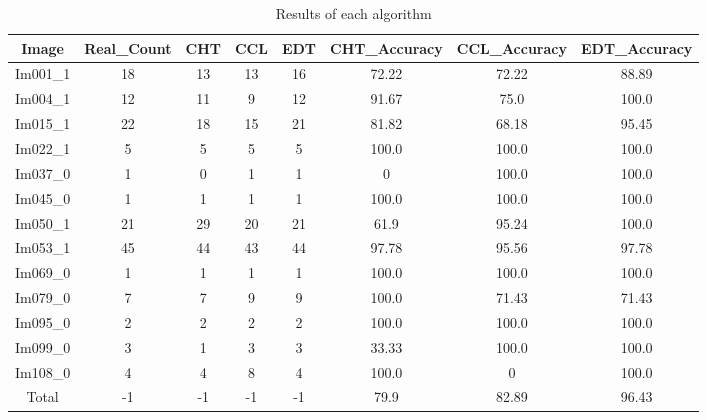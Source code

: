 \begin{table}[H]
    \centering
    \begin{tabular}{|c|c|c|c|c|c|c|c|}
    \hline
     \textbf{Image} & \textbf{Real\_Count} & \textbf{CHT} & \textbf{CCL} & \textbf{EDT} & \textbf{CHT\_Accuracy} & \textbf{CCL\_Accuracy} & \textbf{EDT\_Accuracy} \\ \hline
     Im001\_1 & 18 & 13 & 13 & 16 & 72.22 & 72.22 & 88.89 \\ 
     Im004\_1 & 12 & 11 & 9 & 12 & 91.67 & 75.0 & 100.0 \\ 
     Im015\_1 & 22 & 18 & 15 & 21 & 81.82 & 68.18 & 95.45 \\ 
     Im022\_1 & 5 & 5 & 5 & 5 & 100.0 & 100.0 & 100.0 \\ 
     Im037\_0 & 1 & 0 & 1 & 1 & 0 & 100.0 & 100.0 \\ 
     Im045\_0 & 1 & 1 & 1 & 1 & 100.0 & 100.0 & 100.0 \\ 
     Im050\_1 & 21 & 29 & 20 & 21 & 61.9 & 95.24 & 100.0 \\ 
     Im053\_1 & 45 & 44 & 43 & 44 & 97.78 & 95.56 & 97.78 \\ 
     Im069\_0 & 1 & 1 & 1 & 1 & 100.0 & 100.0 & 100.0 \\ 
     Im079\_0 & 7 & 7 & 9 & 9 & 100.0 & 71.43 & 71.43 \\ 
     Im095\_0 & 2 & 2 & 2 & 2 & 100.0 & 100.0 & 100.0 \\ 
     Im099\_0 & 3 & 1 & 3 & 3 & 33.33 & 100.0 & 100.0 \\ 
     Im108\_0 & 4 & 4 & 8 & 4 & 100.0 & 0 & 100.0 \\ \hline
     Total & -1 & -1 & -1 & -1 & 79.9 & 82.89 & 96.43 \\ 
    
    \hline
    \end{tabular}
    \caption{Results of each algorithm}
    \label{Results of each algorithm}
\end{table}
    